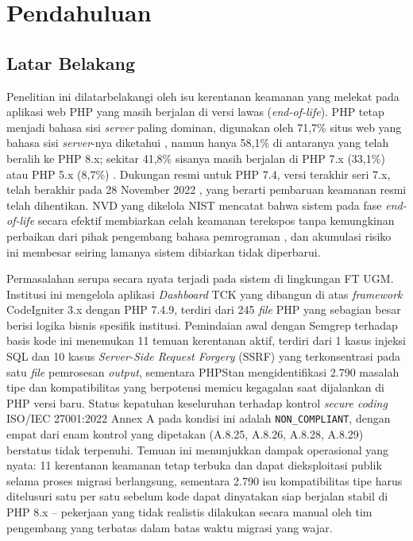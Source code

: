 \chapter{Pendahuluan}

\section{Latar Belakang}

Penelitian ini dilatarbelakangi oleh isu kerentanan keamanan yang melekat pada aplikasi web PHP yang masih berjalan di versi lawas (\textit{end-of-life}). PHP tetap menjadi bahasa sisi \textit{server} paling dominan, digunakan oleh 71,7\% situs web yang bahasa sisi \textit{server}-nya diketahui \cite{w3techs2024php}, namun hanya 58,1\% di antaranya yang telah beralih ke PHP 8.x; sekitar 41,8\% sisanya masih berjalan di PHP 7.x (33,1\%) atau PHP 5.x (8,7\%) \cite{w3techs2024php}. Dukungan resmi untuk PHP 7.4, versi terakhir seri 7.x, telah berakhir pada 28 November 2022 \cite{phpgroup2022supported}, yang berarti pembaruan keamanan resmi telah dihentikan. NVD yang dikelola NIST mencatat bahwa sistem pada fase \textit{end-of-life} secara efektif membiarkan celah keamanan terekspos tanpa kemungkinan perbaikan dari pihak pengembang bahasa pemrograman \cite{nist_nvd}, dan akumulasi risiko ini membesar seiring lamanya sistem dibiarkan tidak diperbarui.

Permasalahan serupa secara nyata terjadi pada sistem di lingkungan FT UGM. Institusi ini mengelola aplikasi \textit{Dashboard} TCK yang dibangun di atas \textit{framework} CodeIgniter 3.x dengan PHP 7.4.9, terdiri dari 245 \textit{file} PHP yang sebagian besar berisi logika bisnis spesifik institusi. Pemindaian awal dengan Semgrep \cite{semgrep2024} terhadap basis kode ini menemukan 11 temuan kerentanan aktif, terdiri dari 1 kasus injeksi SQL dan 10 kasus \textit{Server-Side Request Forgery} (SSRF) yang terkonsentrasi pada satu \textit{file} pemrosesan \textit{output}, sementara PHPStan \cite{phpstan2024} mengidentifikasi 2.790 masalah tipe dan kompatibilitas yang berpotensi memicu kegagalan saat dijalankan di PHP versi baru. 
Status kepatuhan keseluruhan terhadap kontrol \textit{secure coding} ISO/IEC 27001:2022 Annex A pada kondisi ini adalah \texttt{NON\_COMPLIANT}, dengan empat dari enam kontrol yang dipetakan (A.8.25, A.8.26, A.8.28, A.8.29) berstatus tidak terpenuhi. Temuan ini menunjukkan dampak operasional yang nyata: 11 kerentanan keamanan tetap terbuka dan dapat dieksploitasi publik selama proses migrasi berlangsung, sementara 2.790 isu kompatibilitas tipe harus ditelusuri satu per satu sebelum kode dapat dinyatakan siap berjalan stabil di PHP 8.x -- pekerjaan yang tidak realistis dilakukan secara manual oleh tim pengembang yang terbatas dalam batas waktu migrasi yang wajar.

